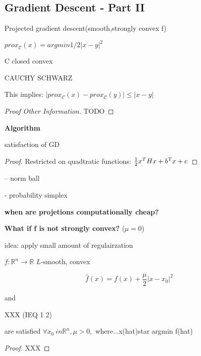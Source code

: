 \subsection{Gradient Descent - Part II}

Projected gradient descent(smooth,strongly convex f)

\begin{definition}[]
	$prox_\mathcal{C}(x)=argmin 1/2|x-y|^2$
\end{definition}

C closed convex

CAUCHY SCHWARZ

This implies:
$|prox_\mathcal{C}(x)-prox_\mathcal{C}(y)|\le|x-y|$


\begin{proof}[Proof Other Information]
	TODO
\end{proof}

\textbf{Algorithm}

\begin{proposition}
	satisfaction of GD
\end{proposition}

\begin{proof}[Proof]
	Restricted on quadtratic functions:
	$\frac{1}{2}x^THx+b^{\textnormal{\scriptsize T}}x +c$

\end{proof}

-- norm ball

- probability simplex

\textbf{when are projetions computationally cheap?}


\textbf{What if f is not strongly convex?} ($\mu=0$)

\rightarrow idea: apply small amount of regulairzation

$f: \mathbb{R}^{n}\rightarrow \mathbb{R}$ $L$-smooth, convex

\[\hat{f}(x) = f(x)+\frac{\mu}{2}|x-x_0|^2\]

and

XXX (IEQ 1 2)

are satisfied $\forall x_0 \ in \mathbb{R}^{n}, \mu > 0,$
where...x(hat)star argmin f(hat)


\begin{proof}[Proof]
	XXX
\end{proof}

